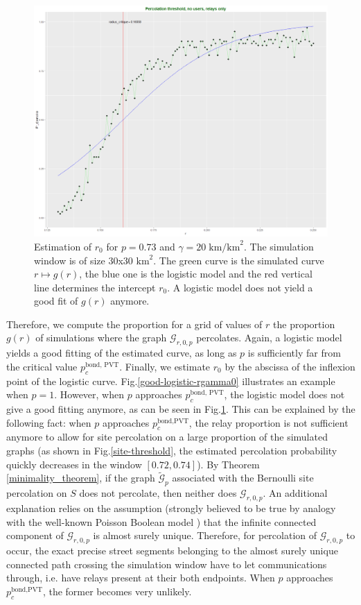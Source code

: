 \documentclass[conference]{IEEEtran}
\begin{document}
\begin{figure}[t!]
\centering
\includegraphics[width=\columnwidth]{Figures/sites-rgamma0-p_0_73.png}
\caption{Estimation of $r_{0}$ for $p=0.73$ and $\gamma = 20 \; \text{km/km}^{2}$. The simulation window is of size 30x30 $\text{km}^{2}$. The green curve is the simulated curve $r \mapsto g(r)$, the blue one is the logistic model and the red vertical line determines the intercept $r_{0}$. A logistic model does not yield a good fit of $g(r)$ anymore.}
\label{bad-logistic-rgamma0}
\end{figure} 
Therefore, we compute the proportion for a grid of values of $r$ the proportion $g(r)$ of simulations where the graph $\mathcal{G}_{r,0,p}$ percolates. Again, a logistic model yields a good fitting of the estimated curve, as long as $p$ is sufficiently far from the critical value $p_{c}^{\text{bond, PVT}}$. Finally, we estimate $r_{0}$ by the abscissa of the inflexion point of the logistic curve. Fig.\ref{good-logistic-rgamma0} illustrates an example when $p=1$. However, when $p$ approaches $p_{c}^{\text{bond, PVT}}$, the logistic model does not give a good fitting anymore, as can be seen in Fig.\ref{bad-logistic-rgamma0}. This can be explained by the following fact: when $p$ approaches $p_{c}^{\text{bond,PVT}}$, the relay proportion is not sufficient anymore to allow for site percolation on a large proportion of the simulated graphs (as shown in Fig.\ref{site-threshold}, the estimated percolation probability quickly decreases in the window $\left[0.72,0.74\right]$). By Theorem \ref{minimality_theorem}, if the graph $\tilde{\mathcal{G}}_{p}$ associated with the Bernoulli site percolation on $S$ does not percolate, then neither does $\mathcal{G}_{r,0,p}$. An additional explanation relies on the assumption (strongly believed to be true by analogy with the well-known Poisson Boolean model \cite{blaszczyszyn_stochastic_2018}) that the infinite connected component of $\mathcal{G}_{r,0,p}$ is almost surely unique. Therefore, for percolation of $\mathcal{G}_{r,0,p}$ to occur, the exact precise street segments belonging to the almost surely unique connected path crossing the simulation window have to let communications through, i.e. have relays present at their both endpoints. When $p$ approaches $p_{c}^{\text{bond,PVT}}$, the former becomes very unlikely.  \\
\end{document}
